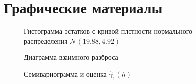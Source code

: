 
\newpage
\section{ Графические материалы}
\label{c:graphs}

\setcounter{figure}{0}

\begin{figure}[H]
\caption{Гистограмма остатков с кривой плотности нормального распределения $\mathcal{N}(19.88, 4.92)$}
\label{img:resid_hist}
\end{figure}

\begin{figure}[H]
\caption{Диаграмма взаимного разброса}
\label{img:hscat}
\end{figure}

\begin{figure}[H]
\caption{Семивариограмма и оценка $ \widehat{\gamma}_1(h) $}
\label{img:lin-modeled}
\end{figure}

